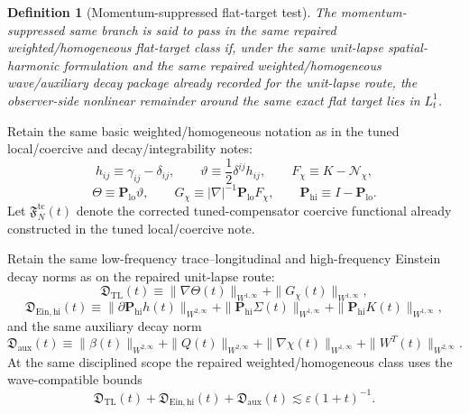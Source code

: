 \documentclass[11pt]{article}
\newtheorem{definition}{Definition}
\begin{document}
\begin{definition}[Momentum-suppressed flat-target test]
\label{def:lt1test}
The momentum-suppressed same branch is said to \emph{pass in the same repaired weighted/homogeneous flat-target class} if, under the same unit-lapse spatial-harmonic formulation and the same repaired weighted/homogeneous wave/auxiliary decay package already recorded for the unit-lapse route, the observer-side nonlinear remainder around the same exact flat target lies in \(L_t^1\).
\end{definition}

Retain the same basic weighted/homogeneous notation as in the tuned local/coercive and decay/integrability notes:
\begin{equation}
h_{ij}\equiv \gamma_{ij}-\delta_{ij},
\qquad
\vartheta\equiv \frac12\delta^{ij}h_{ij},
\qquad
F_\chi\equiv K-\mathcal N_\chi,
\label{eq:basicdefs}
\end{equation}
\begin{equation}
\Theta\equiv \mathbf P_{\mathrm{lo}}\vartheta,
\qquad
G_\chi\equiv |\nabla|^{-1}\mathbf P_{\mathrm{lo}}F_\chi,
\qquad
\mathbf P_{\mathrm{hi}}\equiv I-\mathbf P_{\mathrm{lo}}.
\label{eq:ThetaG}
\end{equation}
Let \(\mathfrak F_N^{\mathrm{tc}}(t)\) denote the corrected tuned-compensator coercive functional already constructed in the tuned local/coercive note.

Retain the same low-frequency trace--longitudinal and high-frequency Einstein decay norms as on the repaired unit-lapse route:
\begin{equation}
\mathfrak D_{\mathrm{TL}}(t)
\equiv
\|\nabla\Theta(t)\|_{W^{1,\infty}}
+\|G_\chi(t)\|_{W^{1,\infty}},
\label{eq:DTL}
\end{equation}
\begin{equation}
\mathfrak D_{\mathrm{Ein,hi}}(t)
\equiv
\|\partial \mathbf P_{\mathrm{hi}}h(t)\|_{W^{2,\infty}}
+\|\mathbf P_{\mathrm{hi}}\Sigma(t)\|_{W^{1,\infty}}
+\|\mathbf P_{\mathrm{hi}}K(t)\|_{W^{1,\infty}},
\label{eq:DEin}
\end{equation}
and the same auxiliary decay norm
\begin{equation}
\mathfrak D_{\mathrm{aux}}(t)
\equiv
\|\beta(t)\|_{W^{2,\infty}}
+\|Q(t)\|_{W^{2,\infty}}
+\|\nabla\chi(t)\|_{W^{1,\infty}}
+\|W^T(t)\|_{W^{2,\infty}}.
\label{eq:Daux}
\end{equation}
At the same disciplined scope the repaired weighted/homogeneous class uses the wave-compatible bounds
\begin{equation}
\mathfrak D_{\mathrm{TL}}(t)
+\mathfrak D_{\mathrm{Ein,hi}}(t)
+\mathfrak D_{\mathrm{aux}}(t)
\lesssim
\varepsilon(1+t)^{-1}.
\label{eq:decays}
\end{equation}
\end{document}
